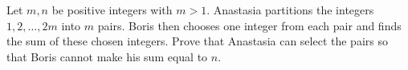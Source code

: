 Let $m, n$ be positive integers with $m > 1$. Anastasia partitions the integers $1, 2, \dots , 2m$ into $m$ pairs. Boris then chooses one integer from each pair and finds the sum of these chosen integers.
Prove that Anastasia can select the pairs so that Boris cannot make his sum equal to $n$.